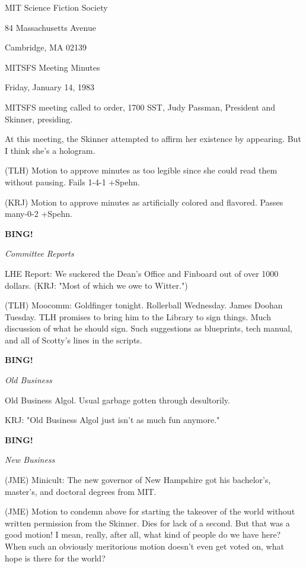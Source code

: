 \documentclass[12pt]{article}
\newcommand{\bing}{{\bf BING!} }
\newcommand{\goto}[1]{\bing \vskip 12pt \centerline{{\em{#1}}}}
\begin{document}
\begin{center}

MIT Science Fiction Society 

84 Massachusetts Avenue

Cambridge, MA 02139

\vspace{12pt}

MITSFS Meeting Minutes 

Friday, January 14, 1983

\end{center}
 
\vspace{18pt}

\setlength{\parskip}{6pt}

\noindent
MITSFS meeting called to order, 1700 SST,
Judy Passman, President and Skinner, presiding.

At this meeting, the Skinner attempted to affirm her existence by appearing. But I think she's a hologram.

(TLH) Motion to approve minutes as too legible since she could read them without pausing. Fails 1-4-1 +Spehn.

(KRJ) Motion to approve minutes as artificially colored and flavored. Passes many-0-2 +Spehn.

\goto{Committee Reports}

LHE Report: We suckered the Dean's Office and Finboard out of over 1000 dollars. (KRJ: "Most of which we owe to Witter.")

(TLH) Moocomm: Goldfinger tonight. Rollerball Wednesday. James Doohan Tuesday. TLH promises to bring him to the Library to sign things. Much discussion of what he should sign. Such suggestions as blueprints, tech manual, and all of Scotty's lines in the scripts.

\goto{Old Business}

Old Business Algol. Usual garbage gotten through desultorily.

KRJ: "Old Business Algol just isn't as much fun anymore."

\goto{New Business}

(JME) Minicult: The new governor of New Hampshire got his bachelor's, master's, and doctoral degrees from MIT.

(JME) Motion to condemn above for starting the takeover of the world without written permission from the Skinner. Dies for lack of a second. But that was a good motion! I mean, really, after all, what kind of people do we have here? When such an obviously meritorious motion doesn't even get voted on, what hope is there for the world?
\end{document}

